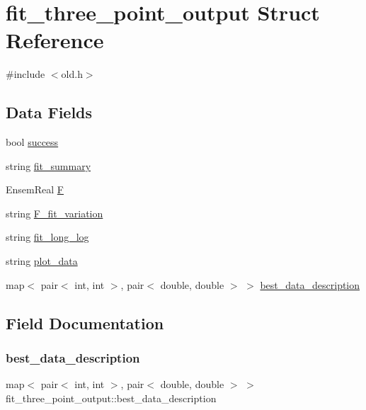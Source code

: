 \hypertarget{structfit__three__point__output}{}\section{fit\+\_\+three\+\_\+point\+\_\+output Struct Reference}
\label{structfit__three__point__output}


{\ttfamily \#include $<$old.\+h$>$}

\subsection*{Data Fields}
\begin{DoxyCompactItemize}
\item 
bool \mbox{\hyperlink{structfit__three__point__output_a3b9d0b643265aad50cb4153703b3d850}{success}}
\item 
string \mbox{\hyperlink{structfit__three__point__output_aca7a99ada72c0842161efefe83439cef}{fit\+\_\+summary}}
\item 
Ensem\+Real \mbox{\hyperlink{structfit__three__point__output_abc454cc4fa6d8de018e46c370fe35fec}{F}}
\item 
string \mbox{\hyperlink{structfit__three__point__output_a373e3fc36d0fd7c867b5336816f85eb3}{F\+\_\+fit\+\_\+variation}}
\item 
string \mbox{\hyperlink{structfit__three__point__output_aa55a85b2350e370d369be47212edbbef}{fit\+\_\+long\+\_\+log}}
\item 
string \mbox{\hyperlink{structfit__three__point__output_ae49fa22b64fe79efc2f36254b92c3810}{plot\+\_\+data}}
\item 
map$<$ pair$<$ int, int $>$, pair$<$ double, double $>$ $>$ \mbox{\hyperlink{structfit__three__point__output_a00398d7525900180b2a2bdf73d025587}{best\+\_\+data\+\_\+description}}
\end{DoxyCompactItemize}


\subsection{Field Documentation}
\mbox{\label{structfit__three__point__output_a00398d7525900180b2a2bdf73d025587}} 
\subsubsection{\texorpdfstring{best\_data\_description}{best\_data\_description}}
{\footnotesize\ttfamily map$<$ pair$<$ int, int $>$, pair$<$ double, double $>$ $>$ fit\+\_\+three\+\_\+point\+\_\+output\+::best\+\_\+data\+\_\+description}

